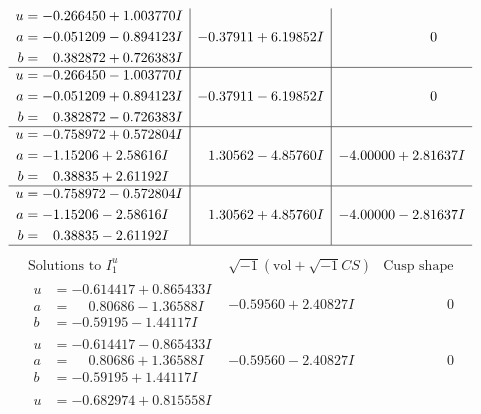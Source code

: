\documentclass[1p]{elsarticle_modified}
\theoremstyle{definition}
\newcommand{\I}{\sqrt{-1}}
\begin{document}
$$\begin{array}{c|c|c}
\begin{aligned}
u &= -0.266450 + 1.003770 I \\
a &= -0.051209 - 0.894123 I \\
b &= \phantom{-}0.382872 + 0.726383 I\end{aligned}
 & -0.37911 + 6.19852 I & \phantom{-0.000000 } 0 \\ \hline\begin{aligned}
u &= -0.266450 - 1.003770 I \\
a &= -0.051209 + 0.894123 I \\
b &= \phantom{-}0.382872 - 0.726383 I\end{aligned}
 & -0.37911 - 6.19852 I & \phantom{-0.000000 } 0 \\ \hline\begin{aligned}
u &= -0.758972 + 0.572804 I \\
a &= -1.15206 + 2.58616 I \\
b &= \phantom{-}0.38835 + 2.61192 I\end{aligned}
 & \phantom{-}1.30562 - 4.85760 I & -4.00000 + 2.81637 I \\ \hline\begin{aligned}
u &= -0.758972 - 0.572804 I \\
a &= -1.15206 - 2.58616 I \\
b &= \phantom{-}0.38835 - 2.61192 I\end{aligned}
 & \phantom{-}1.30562 + 4.85760 I & -4.00000 - 2.81637 I\\
 \hline 
 \end{array}$$\newpage$$\begin{array}{c|c|c}  
\text{Solutions to }I^u_{1}& \I (\text{vol} + \sqrt{-1}CS) & \text{Cusp shape}\\
 \hline 
\begin{aligned}
u &= -0.614417 + 0.865433 I \\
a &= \phantom{-}0.80686 - 1.36588 I \\
b &= -0.59195 - 1.44117 I\end{aligned}
 & -0.59560 + 2.40827 I & \phantom{-0.000000 } 0 \\ \hline\begin{aligned}
u &= -0.614417 - 0.865433 I \\
a &= \phantom{-}0.80686 + 1.36588 I \\
b &= -0.59195 + 1.44117 I\end{aligned}
 & -0.59560 - 2.40827 I & \phantom{-0.000000 } 0 \\ \hline\begin{aligned}
u &= -0.682974 + 0.815558 I \\

\end{aligned}
\end{array}$$
\end{document}
